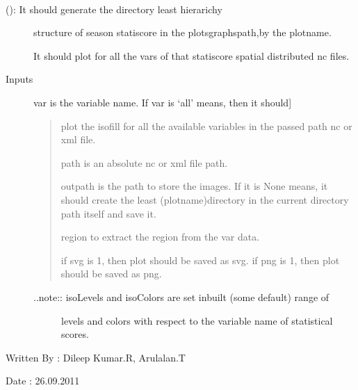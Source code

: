 \documentclass[letterpaper,10pt,english]{sphinxmanual}
\begin{document}
\begin{fulllineitems}
\label{diagnosis:generate_stati_score_spatial_distribution_plots.genIsoFillPlots}~\begin{description}
\item[{{\hyperref[diagnosis:generate_stati_score_spatial_distribution_plots.genIsoFillPlots]{}} (): It should generate the directory least hierarichy}] \leavevmode
structure of season statiscore in the plotsgraphspath,by the plotname.

It should plot for all the vars of that statiscore spatial distributed
nc files.

\item[{Inputs}] \leavevmode{[}var is the variable name. If var is `all' means, then it should{]}\begin{quote}

plot the isofill for all the available variables in the passed
path nc or xml file.

path is an absolute nc or xml file path.

outpath is the path to store the images. If it is None means, it
should create the least (plotname)directory in the current
directory path itself and save it.

region to extract the region from the var data.

if svg is 1, then plot should be saved as svg.
if png is 1, then plot should be saved as png.
\end{quote}
\begin{description}
\item[{..note:: isoLevels and isoColors are set inbuilt (some default) range of}] \leavevmode
levels and colors with respect to the variable name of statistical
scores.

\end{description}

\end{description}

Written By : Dileep Kumar.R, Arulalan.T

Date : 26.09.2011

\end{fulllineitems}

\end{document}
